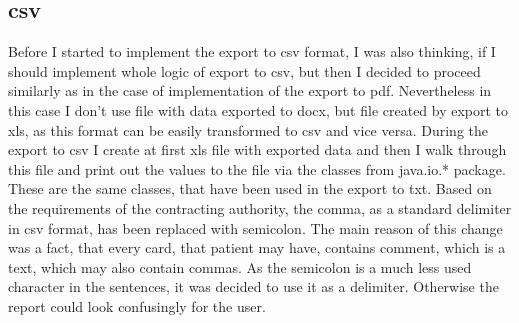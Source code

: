 \documentclass[thesis=B,english]{FITthesis}[2012/10/20]
\begin{document}
\subsection{csv}
Before I started to implement the export to csv format, I was also thinking, if I should implement whole logic of export to csv, but then I decided to proceed similarly as in the case of implementation of the export to pdf. Nevertheless in this case I don't use file with data exported to docx, but file created by export to xls, as this format can be easily transformed to csv and vice versa. During the export to csv I create at first xls file with exported data and then I walk through this file and print out the values to the file via the classes from java.io.* package. These are the same classes, that have been used in the export to txt. Based on the requirements of the contracting authority, the comma, as a standard delimiter in csv format, has been replaced with semicolon. The main reason of this change was a fact, that every card, that patient may have, contains comment, which is a text, which may also contain commas. As the semicolon is a much less used character in the sentences, it was decided to use it as a delimiter. Otherwise the report could look confusingly for the user.
\end{document}
